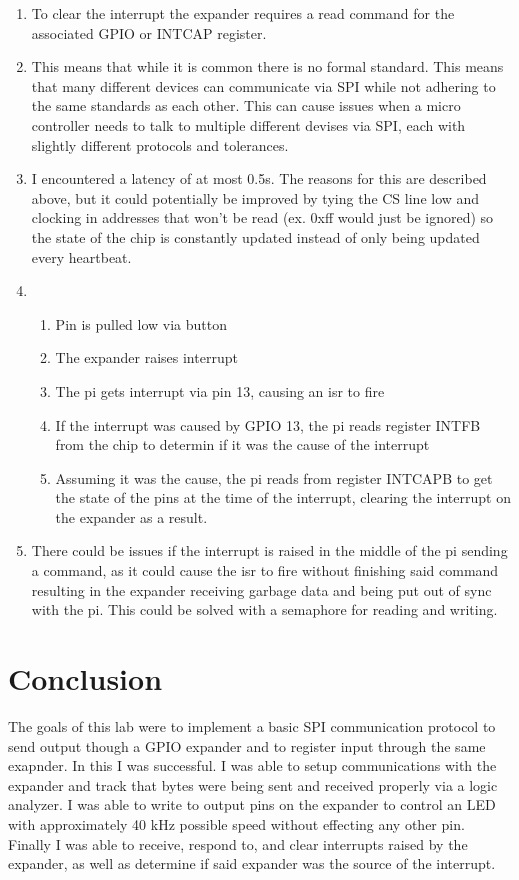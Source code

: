 \documentclass[sigconf]{article}
\begin{document}
\begin{enumerate}
    \item To clear the interrupt the expander requires a read command for the associated GPIO or INTCAP register.
    \item This means that while it is common there is no formal standard. This means that many different devices can communicate via SPI while not adhering to the same standards as each other. This can cause issues when a micro controller needs to talk to multiple different devises via SPI, each with slightly different protocols and tolerances.
    \item I encountered a latency of at most 0.5s. The reasons for this are described above, but it could potentially be improved by tying the CS line low and clocking in addresses that won't be read (ex. 0xff would just be ignored) so the state of the chip is constantly updated instead of only being updated every heartbeat.
    \item \begin{enumerate}
        \item Pin is pulled low via button
        \item The expander raises interrupt
        \item The pi gets interrupt via pin 13, causing an isr to fire
        \item If the interrupt was caused by GPIO 13, the pi reads register INTFB from the chip to determin if it was the cause of the interrupt
        \item Assuming it was the cause, the pi reads from register INTCAPB to get the state of the pins at the time of the interrupt, clearing the interrupt on the expander as a result.
        \end{enumerate}
    \item There could be issues if the interrupt is raised in the middle of the pi sending a command, as it could cause the isr to fire without finishing said command resulting in the expander receiving garbage data and being put out of sync with the pi. This could be solved with a semaphore for reading and writing.
\end{enumerate}


\section*{Conclusion}

The goals of this lab were to implement a basic SPI communication protocol to send output though a GPIO expander and to register input through the same exapnder. In this I was successful. I was able to setup communications with the expander and track that bytes were being sent and received properly via a logic analyzer. I was able to write to output pins on the expander to control an LED with approximately 40 kHz possible speed without effecting any other pin. Finally I was able to receive, respond to, and clear interrupts raised by the expander, as well as determine if said expander was the source of the interrupt.
\end{document}
